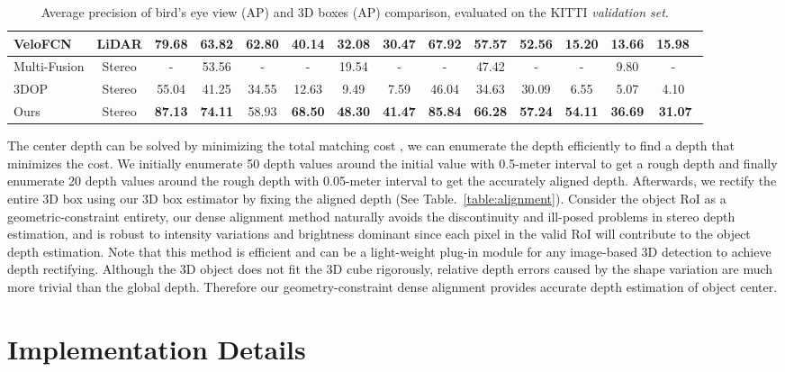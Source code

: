 \documentclass[10pt,twocolumn,letterpaper]{article}
\begin{document}
\begin{table*}
\begin{center}
{\begin{tabular}{l|c|ccc|ccc|ccc|ccc}
					\hline
					VeloFCN\cite{li2016vehicle} & LiDAR & 79.68 & 63.82 & \textbf{62.80} & 40.14 & 32.08 & 30.47 & 67.92 & 57.57 & {52.56} & 15.20 & 13.66 & 15.98 \,\\
					\hline
					Multi-Fusion\cite{cvpr18xu} & Stereo & - & 53.56 & - & - & 19.54 & - & - & 47.42 & - & - & 9.80 & - \,\\
					3DOP\cite{3dopJournal} & Stereo & 55.04 & 41.25 & 34.55 & 12.63 & 9.49 & 7.59 & 46.04 & 34.63 & 30.09 & 6.55 & 5.07 & 4.10 \,\\
Ours & Stereo & \textbf{87.13} & \textbf{74.11} & 58.93 & \textbf{68.50} & \textbf{48.30} & \textbf{41.47} & \textbf{85.84} & \textbf{66.28} & \textbf{57.24} & \textbf{54.11} & \textbf{36.69} & \textbf{31.07}\, \\
				\end{tabular}
			}		
		\end{center}
		\caption{Average precision of bird's eye view (AP) and 3D boxes (AP) comparison, evaluated on the KITTI \textit{validation set}.}
		\label{table:SOTA}
	\end{table*}The center depth  can be solved by minimizing the total matching cost , we can enumerate the depth efficiently to find a depth that minimizes the cost. We initially enumerate 50 depth values around the initial value with 0.5-meter interval to get a rough depth and finally enumerate 20 depth values around the rough depth with 0.05-meter interval to get the accurately aligned depth. Afterwards, we rectify the entire 3D box using our 3D box estimator by fixing the aligned depth (See Table.~\ref{table:alignment}). Consider the object RoI as a geometric-constraint entirety, our dense alignment method naturally avoids the discontinuity and ill-posed problems in stereo depth estimation, and is robust to intensity variations and brightness dominant since each pixel in the valid RoI will contribute to the object depth estimation. Note that this method is efficient and can be a light-weight plug-in module for any image-based 3D detection to achieve depth rectifying. Although the 3D object does not fit the 3D cube rigorously, relative depth errors caused by the shape variation are much more trivial than the global depth. Therefore our geometry-constraint dense alignment provides accurate depth estimation of object center.
\section{Implementation Details}
	
\end{document}
